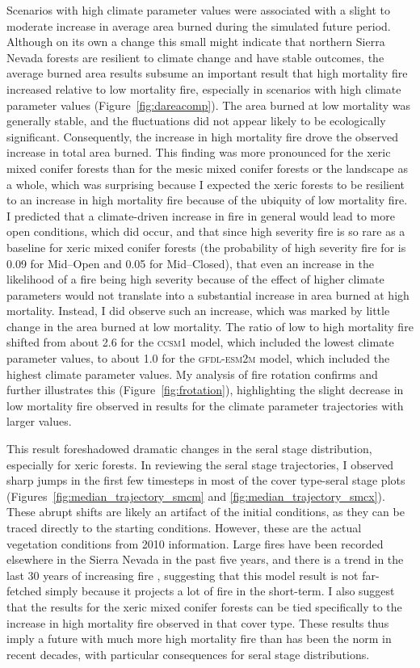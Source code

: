 Scenarios with high climate parameter values were associated with a slight to moderate increase in average area burned during the simulated future period. Although on its own a change this small might indicate that northern Sierra Nevada forests are resilient to climate change and have stable outcomes, the average burned area results subsume an important result that high mortality fire increased relative to low mortality fire, especially  in scenarios with high climate parameter values (Figure~\ref{fig:dareacomp}). The area burned at low mortality was generally stable, and the fluctuations did not appear likely to be ecologically significant. Consequently, the increase in high mortality fire drove the observed increase in total area burned. This finding was more pronounced for the xeric mixed conifer forests than for the mesic mixed conifer forests or the landscape as a whole, which was surprising because I expected the xeric forests to be resilient to an increase in high mortality fire because of the ubiquity of low mortality fire. I predicted that a climate-driven increase in fire in general would lead to more open conditions, which did occur, and that since high severity fire is so rare as a baseline for xeric mixed conifer forests (the probability of high severity fire for is 0.09 for Mid--Open and 0.05 for Mid--Closed), that even an increase in the likelihood of a fire being high severity because of the effect of higher climate parameters would not translate into a substantial increase in area burned at high mortality. Instead, I did observe such an increase, which was marked by little change in the area burned at low mortality. The ratio of low to high mortality fire shifted from about 2.6 for the \textsc{ccsm1} model, which included the lowest climate parameter values, to about 1.0 for the \textsc{gfdl-esm2m} model, which included the highest climate parameter values. My analysis of fire rotation confirms and further illustrates this (Figure~\ref{fig:frotation}), highlighting the slight decrease in low mortality fire observed in results for the climate parameter trajectories with larger values. 

This result foreshadowed dramatic changes in the seral stage distribution, especially for xeric forests. In reviewing the seral stage trajectories, I observed sharp jumps in the first few timesteps in most of the cover type-seral stage plots (Figures~\ref{fig:median_trajectory_smcm} and \ref{fig:median_trajectory_smcx}). These abrupt shifts are likely an artifact of the initial conditions, as they can be traced directly to the starting conditions. However, these are the actual vegetation conditions from 2010 information. Large fires have been recorded elsewhere in the Sierra Nevada in the past five years, and there is a trend in the last 30 years of increasing fire \citep{Miller2012,Lydersen2014}, suggesting that this model result is not far-fetched simply because it projects a lot of fire in the short-term. I also suggest that the results for the xeric mixed conifer forests can be tied specifically to the increase in high mortality fire observed in that cover type. These results thus imply a future with much more high mortality fire than has been the norm in recent decades, with particular consequences for seral stage distributions.

